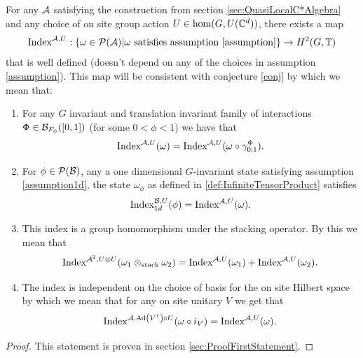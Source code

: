 \documentclass[12pt,a4paper,twoside]{article}
\numberwithin{equation}{section}
\begin{document}
\begin{theorem}\label{thrm:ExistenceFirstIndex}
	For any $\AA$ satisfying the construction from section \ref{sec:QuasiLocalC*Algebra} and any choice of on site group action $U\in\hom(G,U(\CC^d))$, there exists a map
	\begin{equation}
		\textrm{Index}^{\AA,U}:\{\omega\in\PP(\AA)|\omega\text{ satisfies assumption \ref{assumption}}\}\rightarrow H^2(G,\TT)
	\end{equation}
	that is well defined (doesn't depend on any of the choices in assumption \ref{assumption}). This map will be consistent with conjecture \ref{conj} by which we mean that:
	\begin{enumerate}
		\item For any $G$ invariant and translation invariant family of interactions $\Phi\in\BB_{F_{\phi}}([0,1])$ (for some $0<\phi<1$) we have that
		\begin{equation}
			\textrm{Index}^{\AA,U}(\omega)=\textrm{Index}^{\AA,U}(\omega\circ\gamma^{\Phi}_{0;1}).
		\end{equation}
		\item For $\phi\in\PP(\BB)$, any a one dimensional $G$-invariant state satisfying assumption \ref{assumption1d}, the state $\omega_\phi$ as defined in \ref{def:InfiniteTensorProduct} satisfies
		\begin{equation}
			\textrm{Index}^{\BB,U}_{1d}(\phi)=\textrm{Index}^{\AA,U}(\omega).
		\end{equation}
		\item This index is a group homomorphism under the stacking operator. By this we mean that
		\begin{equation}
			\textrm{Index}^{\AA^2,U\otimes U}(\omega_1\otimes_{\text{stack}}\omega_2)=\textrm{Index}^{\AA,U}(\omega_1)+\textrm{Index}^{\AA,U}(\omega_2).
		\end{equation}
		\item The index is independent on the choice of basis for the on site Hilbert space by which we mean that for any on site unitary $V$ we get that
		\begin{equation}
			\textrm{Index}^{\AA,\Ad{V^\dagger}\circ U}(\omega\circ i_V)=\textrm{Index}^{\AA,U}(\omega).
		\end{equation}
	\end{enumerate}
\end{theorem}
\begin{proof}
	This statement is proven in section \ref{sec:ProofFirstStatement}.
\end{proof}
\end{document}
